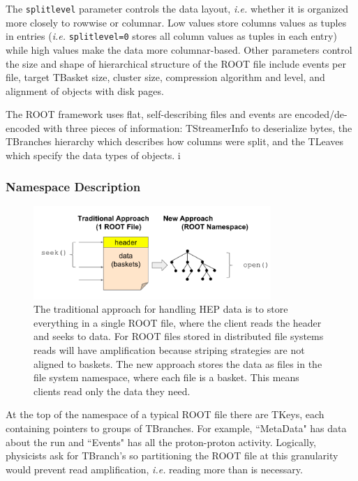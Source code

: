 The \texttt{splitlevel} parameter controls the data layout, {\it i.e.}
whether it is organized more closely to rowwise or columnar. Low values
store columns values as tuples in entries ({\it i.e.} \texttt{splitlevel=0}
stores all column values as tuples in each entry) while high values make
the data more columnar-based. Other parameters control the size and shape
of hierarchical structure of the ROOT file include events per file, target
TBasket size, cluster size, compression algorithm and level, and alignment
of objects with disk pages.

The ROOT framework uses flat, self-describing files and events are
encoded/de-encoded with three pieces of information: TStreamerInfo to
deserialize bytes, the TBranches hierarchy which describes how columns were
split, and the TLeaves which specify the data types of objects. i

\subsubsection{Namespace Description}

\begin{figure}[tb]
\centering
  \includegraphics[width=90mm]{figures/tree_hep.png} 
  \caption{The traditional approach for handling HEP data is to store
everything in a single ROOT file, where the client reads the header and seeks
to data. For ROOT files stored in distributed file systems reads will have
amplification because striping strategies are not aligned to baskets. The new
approach stores the data as files in the file system namespace, where each file
is a basket. This means clients read only the data they need.
  }\label{fig:tree_hep}
\end{figure}

At the top of the namespace of a typical ROOT file there are TKeys, each
containing pointers to groups of TBranches. For example, ``MetaData" has data
about the run and ``Events" has all the proton-proton activity. Logically,
physicists ask for TBranch's so partitioning the ROOT file at this granularity
would prevent read amplification, {\it i.e.} reading more than is necessary.

